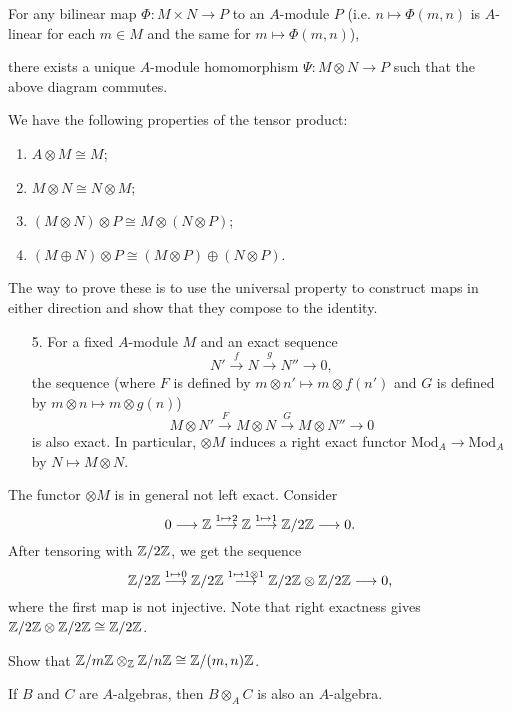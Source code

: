 \begin{prop}
  For any bilinear map
  $\Phi : M \times N \to P$ to
  an $A$-module $P$ (i.e.
  $n \mapsto \Phi(m, n)$ is $A$-linear
  for each $m \in M$ and the same
  for $m \mapsto \Phi(m, n)$),
  \begin{center}
  \end{center}
  there exists a unique $A$-module
  homomorphism $\Psi : M \otimes N \to P$
  such that the above diagram commutes.
\end{prop}

\begin{remark}
  We have the following properties
  of the tensor product:
  \begin{enumerate}
    \item $A \otimes M \cong M$;
    \item $M \otimes N \cong N \otimes M$;
    \item $(M \otimes N) \otimes P \cong M \otimes (N \otimes P)$;
    \item $(M \oplus N) \otimes P \cong (M \otimes P) \oplus (N \otimes P)$.
  \end{enumerate}
  The way to prove these is to use
  the universal property to construct
  maps in either direction and show that
  they compose to the identity.
  \begin{enumerate}
    \item[5.] For a fixed $A$-module
      $M$ and an exact sequence
      \[
        N' \overset{f}{\longrightarrow} N \overset{g}{\longrightarrow} N'' \longrightarrow 0,
      \]
      the sequence (where
      $F$ is defined by $m \otimes n' \mapsto m \otimes f(n')$ and
      $G$ is defined by $m \otimes n \mapsto m \otimes g(n)$)
      \[
        M \otimes N' \overset{F}{\longrightarrow} M \otimes N \overset{G}{\longrightarrow} M \otimes N'' \longrightarrow 0
      \]
      is also exact. In particular,
      $\otimes M$ induces a
      right exact functor
      $\mathrm{Mod}_A \to \mathrm{Mod}_A$
      by $N \mapsto M \otimes N$.
  \end{enumerate}
\end{remark}

\begin{example}
  The functor $\otimes M$ is in general
  not left exact. Consider
  \[
    0 \longrightarrow \mathbb{Z} \overset{1 \mapsto 2}{\longrightarrow} \mathbb{Z} \overset{1 \mapsto 1}{\longrightarrow} \mathbb{Z} / 2\mathbb{Z} \longrightarrow 0.
  \]
  After tensoring with $\mathbb{Z} / 2\mathbb{Z}$, we get
  the sequence
  \[
    \mathbb{Z} / 2\mathbb{Z} \overset{1 \mapsto 0}{\longrightarrow} \mathbb{Z} / 2\mathbb{Z} \overset{1 \mapsto 1 \otimes 1}{\longrightarrow} \mathbb{Z} / 2\mathbb{Z} \otimes \mathbb{Z} / 2\mathbb{Z} \longrightarrow 0,
  \]
  where the first map is not injective.
  Note that right exactness gives
  $\mathbb{Z} / 2\mathbb{Z} \otimes \mathbb{Z} / 2\mathbb{Z} \cong \mathbb{Z} / 2\mathbb{Z}$.
\end{example}

\begin{exercise}
  Show that $\mathbb{Z} / m\mathbb{Z} \otimes_{\mathbb{Z}} \mathbb{Z} / n\mathbb{Z} \cong \mathbb{Z} / (m, n)\mathbb{Z}$.
\end{exercise}

\begin{prop}
  If $B$ and $C$ are $A$-algebras, then
  $B \otimes_A C$ is also an $A$-algebra.
\end{prop}
